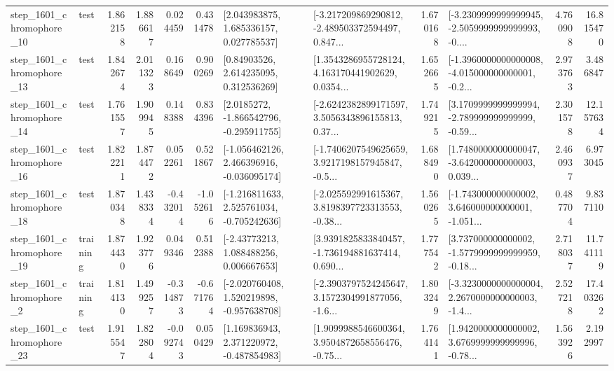 \begin{tabular}{llrrrrllrlrr}
 step\_1601\_chromophore\_10 &      test &      1.862158 &    1.886617 &      0.024459 &  0.431478 &     [2.043983875, 1.685336157, 0.027785537] &  [-3.217209869290812, -2.489503372594497, 0.847... &       1.670168 &  [-3.2309999999999945, -2.5059999999999993, -0.... &            4.760908 &         16.815470 \\
 step\_1601\_chromophore\_13 &      test &      1.842674 &    2.011323 &      0.168649 &  0.900269 &      [0.84903526, 2.614235095, 0.312536269] &  [1.3543286955728124, 4.163170441902629, 0.0354... &       1.652665 &  [-1.3960000000000008, -4.015000000000001, -0.2... &            2.973763 &          3.486847 \\
 step\_1601\_chromophore\_14 &      test &      1.761557 &    1.909945 &      0.148388 &  0.834396 &     [2.0185272, -1.866542796, -0.295911755] &  [-2.6242382899171597, 3.5056343896155813, 0.37... &       1.749215 &  [3.1709999999999994, -2.789999999999999, -0.59... &            2.301578 &         12.157634 \\
 step\_1601\_chromophore\_16 &      test &      1.822211 &    1.874472 &      0.052261 &  0.521867 &   [-1.056462126, 2.466396916, -0.036095174] &  [-1.7406207549625659, 3.9217198157945847, -0.5... &       1.688490 &  [1.7480000000000047, -3.642000000000003, 0.039... &            2.460937 &          6.973045 \\
 step\_1601\_chromophore\_18 &      test &      1.870348 &    1.438334 &     -0.432014 & -1.052616 &   [-1.216811633, 2.525761034, -0.705242636] &  [-2.025592991615367, 3.8198397723313553, -0.38... &       1.560265 &  [-1.743000000000002, 3.646000000000001, -1.051... &            0.487704 &          9.837110 \\
 step\_1601\_chromophore\_19 &  training &      1.874430 &    1.923776 &      0.049346 &  0.512388 &     [-2.43773213, 1.088488256, 0.006667653] &  [3.9391825833840457, -1.736194881637414, 0.690... &       1.777542 &  [3.737000000000002, -1.5779999999999959, -0.18... &            2.718037 &         11.741119 \\
  step\_1601\_chromophore\_2 &  training &      1.814130 &    1.499257 &     -0.314873 & -0.671764 &   [-2.020760408, 1.520219898, -0.957638708] &  [-2.3903797524245647, 3.1572304991877056, -1.6... &       1.803249 &  [-3.3230000000000004, 2.2670000000000003, -1.4... &            2.527218 &         17.403262 \\
 step\_1601\_chromophore\_23 &      test &      1.915547 &    1.822804 &     -0.092743 &  0.050429 &    [1.169836943, 2.371220972, -0.487854983] &  [1.9099988546600364, 3.9504872658556476, -0.75... &       1.764141 &  [1.9420000000000002, 3.6769999999999996, -0.78... &            1.563926 &          2.192997 \\

\end{tabular}
